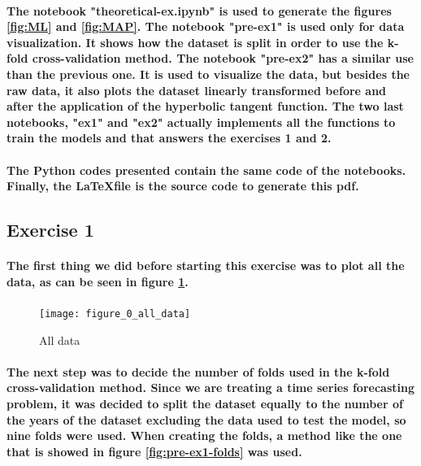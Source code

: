 \documentclass[a4paper]{article}
\begin{document}
\paragraph{The notebook "theoretical-ex.ipynb" is used to generate the figures \ref{fig:ML} and \ref{fig:MAP}. The notebook "pre-ex1" is used only for data visualization. It shows how the dataset is split in order to use the k-fold cross-validation method. The notebook "pre-ex2" has a similar use than the previous one. It is used to visualize the data, but besides the raw data, it also plots the dataset linearly transformed before and after the application of the hyperbolic tangent function. The two last notebooks, "ex1" and "ex2" actually implements all the functions to train the models and that answers the exercises 1 and 2.}
\paragraph{The Python codes presented contain the same code of the notebooks. Finally, the \LaTeX file is the source code to generate this pdf.}

\subsection{Exercise 1}

\paragraph{The first thing we did before starting this exercise was to plot all the data, as can be seen in figure \ref{fig:pre-ex1-0}.}

\begin{figure}[H]
    \centering
    \texttt{[image: figure\_0\_all\_data]}
    \caption{All data}
    \label{fig:pre-ex1-0}
\end{figure}

\paragraph{The next step was to decide the number of folds used in the k-fold cross-validation method. Since we are treating a time series forecasting problem, it was decided to split the dataset equally to the number of the years of the dataset excluding the data used to test the model, so nine folds were used. When creating the folds, a method like the one that is showed in figure \ref{fig:pre-ex1-folds} was used.}
\end{document}
